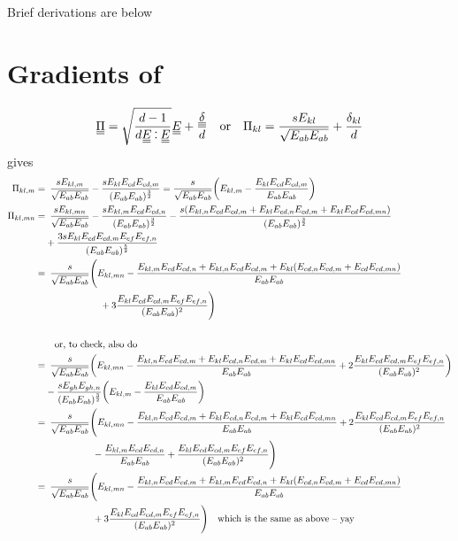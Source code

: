 \documentclass[11pt]{article}
\begin{document}
Brief derivations are below

\newpage
\section{Gradients of \PP}
\begin{equation}
    \du{\Pi} = \sqrt{\frac{d-1}{d \du{E} \cddot \du{E}}} \du{E} + \frac{\du{\delta}}{d} \qq{or} \Pi_{kl} = \frac{s E_{kl}}{\sqrt{E_{ab}E_{ab}}} + \frac{\delta_{kl}}{d} \label{eq:piex}
\end{equation}
gives
\begin{align}
    \Pi_{kl,m} =&\enspace \frac{s E_{kl,m}}{\sqrt{E_{ab}E_{ab}}} - \frac{s E_{kl}E_{cd}E_{cd,m}}{({E_{ab}E_{ab}})^\frac{3}{2}} = \frac{s}{\sqrt{E_{ab}E_{ab}}} \qty(E_{kl,m} - \frac{E_{kl}E_{cd}E_{cd,m}}{E_{ab}E_{ab}}) \\
    \Pi_{kl,mn} =&\enspace \frac{s E_{kl,mn}}{\sqrt{E_{ab}E_{ab}}} - \frac{s E_{kl,m}E_{cd}E_{cd,n}}{({E_{ab}E_{ab}})^\frac{3}{2}} - \frac{s (E_{kl,n}E_{cd}E_{cd,m} + E_{kl}E_{cd,n}E_{cd,m} + E_{kl}E_{cd}E_{cd,mn})}{({E_{ab}E_{ab}})^\frac{3}{2}} \\
    &+ \frac{3 s E_{kl}E_{cd}E_{cd,m}E_{ef}E_{ef,n}}{({E_{ab}E_{ab}})^\frac{5}{2}} 
    \nonumber \\
    =&\enspace \frac{s}{\sqrt{E_{ab}E_{ab}}} \Biggl( E_{kl,mn} -\frac{E_{kl,m}E_{cd}E_{cd,n} + E_{kl,n}E_{cd}E_{cd,m} + E_{kl} (E_{cd,n}E_{cd,m} + E_{cd}E_{cd,mn})}{E_{ab}E_{ab}} \\
    &\phantom{\frac{s}{\sqrt{E_{ab}E_{ab}}\Biggl(} \Biggl(}+ 3\frac{E_{kl}E_{cd}E_{cd,m}E_{ef}E_{ef,n}}{(E_{ab}E_{ab})^2} \Biggr) \nonumber \\
    &\qq{or, to check, also do} \nonumber \\
    =&\enspace \frac{s}{\sqrt{E_{ab}E_{ab}}}\qty(E_{kl,mn} - \frac{E_{kl,n}E_{cd}E_{cd,m} + E_{kl}E_{cd,n}E_{cd,m} + E_{kl}E_{cd}E_{cd,mn}}{E_{ab}E_{ab}} + 2\frac{E_{kl}E_{cd}E_{cd,m}E_{ef}E_{ef,n}}{(E_{ab}E_{ab})^2}) \\
    &- \frac{s E_{gh}E_{gh,n}}{(E_{ab}E_{ab})^\frac{3}{2}} \qty(E_{kl,m} - \frac{E_{kl}E_{cd}E_{cd,m}}{E_{ab}E_{ab}}) \nonumber \\
    =&\enspace \frac{s}{\sqrt{E_{ab}E_{ab}}} \Biggl(E_{kl,mn} - \frac{E_{kl,n}E_{cd}E_{cd,m} + E_{kl}E_{cd,n}E_{cd,m} + E_{kl}E_{cd}E_{cd,mn}}{E_{ab}E_{ab}} + 2\frac{E_{kl}E_{cd}E_{cd,m}E_{ef}E_{ef,n}}{(E_{ab}E_{ab})^2} \\
    &\phantom{\frac{s}{\sqrt{E_{ab}E_{ab}}} \Biggl(}- \frac{E_{kl,m}E_{cd}E_{cd,n}}{E_{ab}E_{ab}} + \frac{E_{kl}E_{cd}E_{cd,m}E_{ef}E_{ef,n}}{(E_{ab}E_{ab})^2} \Biggr) \nonumber \\
    =&\enspace \frac{s}{\sqrt{E_{ab}E_{ab}}} \Biggl(E_{kl,mn} - \frac{E_{kl,n}E_{cd}E_{cd,m} + E_{kl,m}E_{cd}E_{cd,n} + E_{kl}(E_{cd,n}E_{cd,m} + E_{cd}E_{cd,mn})}{E_{ab}E_{ab}} \\
    &\phantom{\frac{s}{\sqrt{E_{ab}E_{ab}}} \Biggl(} + 3\frac{E_{kl}E_{cd}E_{cd,m}E_{ef}E_{ef,n}}{(E_{ab}E_{ab})^2} \Biggr) \qq{which is the same as above -- yay} \nonumber
\end{align}
\end{document}
